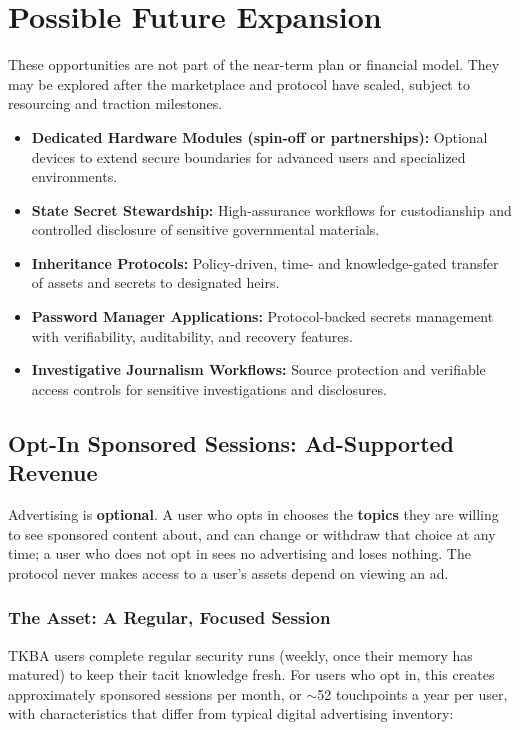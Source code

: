 
\section{Possible Future Expansion}

These opportunities are not part of the near-term plan or financial model. They may be explored after the marketplace and protocol have scaled, subject to resourcing and traction milestones.

\begin{itemize}
  \item \textbf{Dedicated Hardware Modules (spin-off or partnerships):} Optional devices to extend secure boundaries for advanced users and specialized environments.
  \item \textbf{State Secret Stewardship:} High-assurance workflows for custodianship and controlled disclosure of sensitive governmental materials.
  \item \textbf{Inheritance Protocols:} Policy-driven, time- and knowledge-gated transfer of assets and secrets to designated heirs.
  \item \textbf{Password Manager Applications:} Protocol-backed secrets management with verifiability, auditability, and recovery features.
  \item \textbf{Investigative Journalism Workflows:} Source protection and verifiable access controls for sensitive investigations and disclosures.
\end{itemize}

\subsection{Opt-In Sponsored Sessions: Ad-Supported Revenue}

Advertising is \textbf{optional}. A user who opts in chooses the \textbf{topics} they are willing to see sponsored content about, and can change or withdraw that choice at any time; a user who does not opt in sees no advertising and loses nothing. The protocol never makes access to a user's assets depend on viewing an ad.

\subsubsection{The Asset: A Regular, Focused Session}

TKBA users complete regular security runs (weekly, once their memory has matured) to keep their tacit knowledge fresh. For users who opt in, this creates approximately \numfpeval{\weeklyRunsPerMonth} sponsored sessions per month, or $\sim$52 touchpoints a year per user, with characteristics that differ from typical digital advertising inventory:

